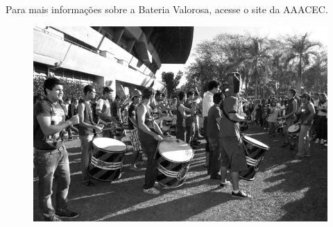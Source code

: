Para mais informações sobre a Bateria Valorosa, acesse o site da AAACEC.

\begin{figure}[H]
    \centering
    \includegraphics[scale=0.27]{img/alem_da_graduacao/valorosa_foto2.jpg}
\end{figure}
